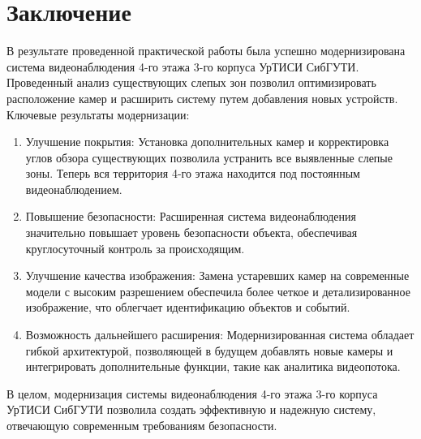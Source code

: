 \section*{Заключение}

В результате проведенной практической работы была успешно модернизирована система видеонаблюдения 
4-го этажа 3-го корпуса УрТИСИ СибГУТИ. Проведенный анализ существующих слепых зон позволил оптимизировать 
расположение камер и расширить систему путем добавления новых устройств.
Ключевые результаты модернизации:
\begin{enumerate}
    \item Улучшение покрытия: Установка дополнительных камер и корректировка углов обзора существующих позволила устранить все выявленные слепые зоны. Теперь вся территория 4-го этажа находится под постоянным видеонаблюдением.
    \item Повышение безопасности: Расширенная система видеонаблюдения значительно повышает уровень безопасности объекта, обеспечивая круглосуточный контроль за происходящим.
    \item Улучшение качества изображения: Замена устаревших камер на современные модели с высоким разрешением обеспечила более четкое и детализированное изображение, что облегчает идентификацию объектов и событий.
    \item Возможность дальнейшего расширения: Модернизированная система обладает гибкой архитектурой, позволяющей в будущем добавлять новые камеры и интегрировать дополнительные функции, такие как аналитика видеопотока.
\end{enumerate}
В целом, модернизация системы видеонаблюдения 4-го этажа 3-го корпуса УрТИСИ СибГУТИ позволила создать эффективную и надежную систему, отвечающую современным требованиям безопасности.
